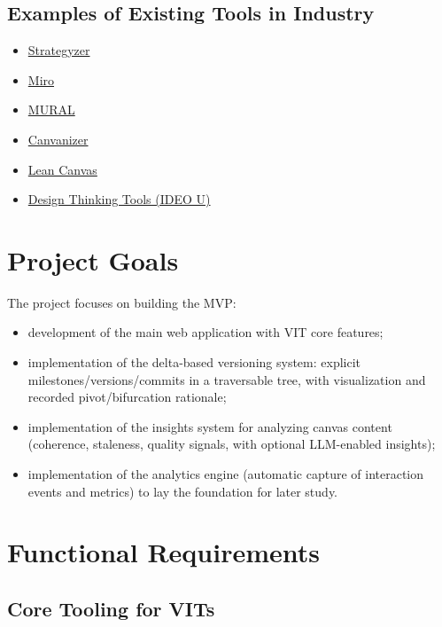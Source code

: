 \documentclass[11pt,a4paper]{article}
\begin{document}
\subsection{Examples of Existing Tools in Industry}

\begin{itemize}
  \item \href{https://www.strategyzer.com/library?type=Tools}{Strategyzer}
  \item \href{https://miro.com}{Miro}
  \item \href{https://www.mural.co/templates}{MURAL}
  \item \href{https://canvanizer.com}{Canvanizer}
  \item \href{https://leanspark.ai/leancanvas}{Lean Canvas}
  \item \href{https://designthinking.ideo.com/}{Design Thinking Tools (IDEO U)}
\end{itemize}

\section{Project Goals}

The project focuses on building the MVP:
\begin{itemize}
  \item development of the main web application with VIT core features;
  \item implementation of the delta-based versioning system: explicit milestones/versions/commits in a traversable tree, with visualization and recorded pivot/bifurcation rationale;
  \item implementation of the insights system for analyzing canvas content (coherence, staleness, quality signals, with optional LLM-enabled insights);
  \item implementation of the analytics engine (automatic capture of interaction events and metrics) to lay the foundation for later study.
\end{itemize}

\section{Functional Requirements}

\subsection{Core Tooling for VITs}
\end{document}
